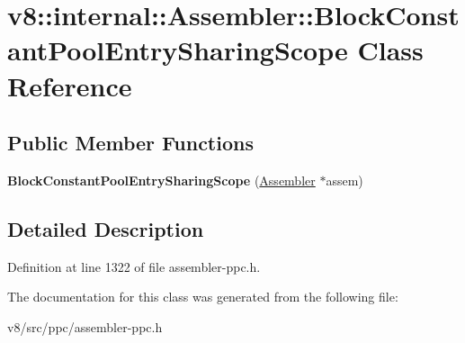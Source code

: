 \hypertarget{classv8_1_1internal_1_1Assembler_1_1BlockConstantPoolEntrySharingScope}{}\section{v8\+:\+:internal\+:\+:Assembler\+:\+:Block\+Constant\+Pool\+Entry\+Sharing\+Scope Class Reference}
\label{classv8_1_1internal_1_1Assembler_1_1BlockConstantPoolEntrySharingScope}
\subsection*{Public Member Functions}
\begin{DoxyCompactItemize}
\item 
\mbox{\label{classv8_1_1internal_1_1Assembler_1_1BlockConstantPoolEntrySharingScope_a48bc151e959e33f606b516b2a73d3b50}} 
{\bfseries Block\+Constant\+Pool\+Entry\+Sharing\+Scope} (\mbox{\hyperlink{classv8_1_1internal_1_1Assembler}{Assembler}} $\ast$assem)
\end{DoxyCompactItemize}


\subsection{Detailed Description}


Definition at line 1322 of file assembler-\/ppc.\+h.



The documentation for this class was generated from the following file\+:\begin{DoxyCompactItemize}
\item 
v8/src/ppc/assembler-\/ppc.\+h\end{DoxyCompactItemize}
